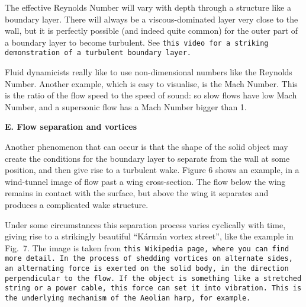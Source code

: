   The effective Reynolds Number will vary with depth through a structure like a 
  boundary layer. There will always be a viscous-dominated layer very close to 
  the wall, but it is perfectly possible (and indeed quite common) for the 
  outer part of a boundary layer to become turbulent. See \tt{}this video\rm{} 
  for a striking demonstration of a turbulent boundary layer. 

  Fluid dynamicists really like to use non-dimensional numbers like the 
  Reynolds Number. Another example, which is easy to visualise, is the Mach 
  Number. This is the ratio of the flow speed to the speed of sound: so slow 
  flows have low Mach Number, and a supersonic flow has a Mach Number bigger 
  than 1. 

  \textbf{E. Flow separation and vortices} 

  Another phenomenon that can occur is that the shape of the solid object may 
  create the conditions for the boundary layer to separate from the wall at 
  some position, and then give rise to a turbulent wake. Figure 6 shows an 
  example, in a wind-tunnel image of flow past a wing cross-section. The flow 
  below the wing remains in contact with the surface, but above the wing it 
  separates and produces a complicated wake structure. 


  Under some circumstances this separation process varies cyclically with time, 
  giving rise to a strikingly beautiful ``Kármán vortex street'', like the 
  example in Fig.\ 7. The image is taken from \tt{}this Wikipedia page\rm{}, 
  where you can find more detail. In the process of shedding vortices on 
  alternate sides, an alternating force is exerted on the solid body, in the 
  direction perpendicular to the flow. If the object is something like a 
  stretched string or a power cable, this force can set it into vibration. This 
  is the underlying mechanism of the Aeolian harp, for example. 


